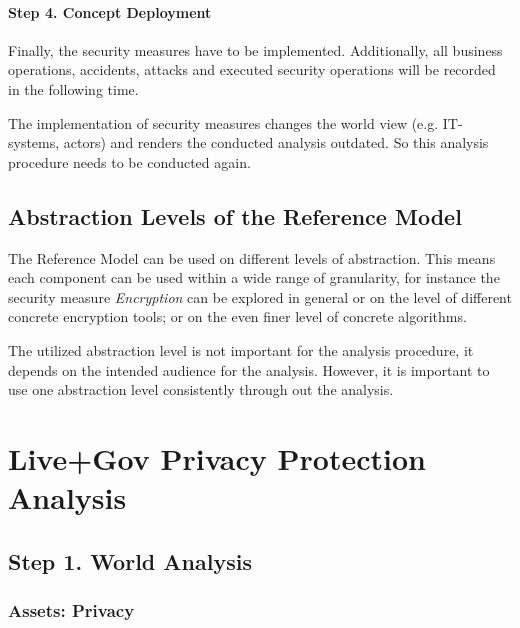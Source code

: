 \paragraph*{Step 4. Concept Deployment}

Finally, the security measures have to be implemented.
Additionally, all business operations, accidents, attacks and executed security operations will be recorded in the following time.

The implementation of security measures changes the world view (e.g. IT-systems, actors) and renders the conducted analysis outdated.
So this analysis procedure needs to be conducted again.

\subsection{Abstraction Levels of the Reference Model}

The Reference Model can be used on different levels of abstraction.
This means each component can be used within a wide range of granularity, for instance the security measure \emph{Encryption} can be explored in general or on the level of different concrete encryption tools; or on the even finer level of concrete algorithms.

The utilized abstraction level is not important for the analysis procedure, it depends on the intended audience for the analysis.
However, it is important to use one abstraction level consistently through out the analysis.


\pagebreak

\section{Live+Gov Privacy Protection Analysis}

\subsection{Step 1. World Analysis}

\subsubsection{Assets: Privacy}

